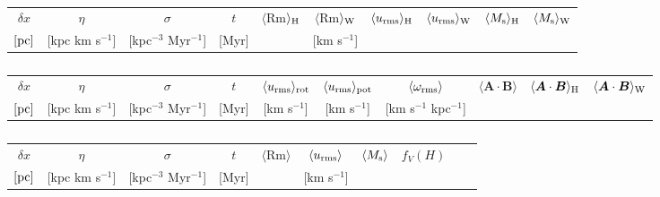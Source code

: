 \documentclass[iop,apj,numberedappendix,twocolappendix]{emulateapj}
\newcommand{\vect}[1]{\boldsymbol{#1}}
\begin{document}

\begin{table}\caption{\label{tab:hot}}
\begin{tabular}{cccccccccc}
\hline
$\delta x$& $\eta$          & $\sigma$              &$ t$&$\langle$Rm$\rangle_{ \rm H}$&$\langle$Rm$\rangle_{ \rm W}$&$\langle u_{\rm rms}\rangle_{ \rm H}$ &$\langle u_{\rm rms}\rangle_{ \rm W}$ &$\langle M_{\rm s}\rangle_{ \rm H}$ &$\langle M_{\rm s}\rangle_{ \rm W}$\\
$[\rm pc]$&[kpc km s$^{-1}$]&[kpc$^{-3}$ Myr$^{-1}$]&[Myr]   &   &    [km s$^{-1}$]&  &\\  
\hline

\end{tabular}
\end{table}


\begin{table}\caption{\label{tab:rot}}
\begin{tabular}{cccccccccc}
\hline
$\delta x$& $\eta$          & $\sigma$              &$ t$&$\langle u_{\rm rms}\rangle_{ \rm rot}$&$\langle u_{\rm rms}\rangle_{ \rm pot}$&$\langle \omega_{\rm rms}\rangle$ &$\langle \vect{A}\cdot\vect{B}\rangle$ &$\langle \vect{A}\cdot\vect{B}\rangle_{ \rm H}$ &$\langle \vect{A}\cdot\vect{B}\rangle_{ \rm W}$\\
$[\rm pc]$&[kpc km s$^{-1}$]&[kpc$^{-3}$ Myr$^{-1}$]&[Myr]   & [km s$^{-1}$]  &    [km s$^{-1}$]& [km s$^{-1}$ kpc$^{-1}$] &\\  
\hline

\end{tabular}
\end{table}


\begin{table}
\caption{\label{tab:Rm10}}
\begin{tabular}{cccccccccc}
\hline
$\delta x$& $\eta$          & $\sigma$              &$ t$&$\langle$Rm$\rangle$&$\langle u_{\rm rms}\rangle$ &$\langle M_{\rm s}\rangle$ & $f_V(H)$\\
$[\rm pc]$&[kpc km s$^{-1}$]&[kpc$^{-3}$ Myr$^{-1}$]&[Myr]   &   &    [km s$^{-1}$]&  &\\  
\hline

\end{tabular}
\end{table}
\end{document}
